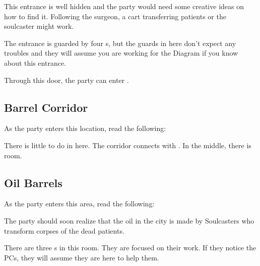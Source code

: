This entrance is well hidden and the party would need some creative ideas on how to find it. Following the surgeon, a cart transferring patients or the soulcaster might work.

The entrance is guarded by four \enemyDiagramMuscle{}s, but the guards in here don't expect any troubles and they will assume you are working for the Diagram if you know about this entrance.

Through this door, the party can enter .





\subsection{Barrel Corridor}
\label{ssec:conclaveHospitalCorridorOil}

As the party enters this location, read the following:


There is little to do in here. The corridor connects with . In the middle, there is  room.




\subsection{Oil Barrels}
\label{ssec:conclaveHospitalOil}

As the party enters this area, read the following:


The party should soon realize that the oil in the city is made by Soulcasters who transform corpses of the dead patients.

There are three \enemyDiagramMuscle{}s in this room. They are focused on their work. If they notice the PCs, they will assume they are here to help them.




